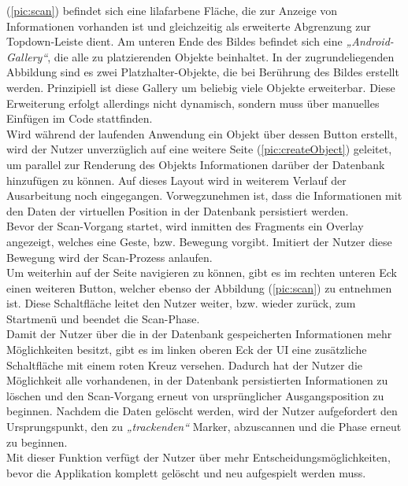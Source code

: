 (\ref{pic:scan}) befindet sich eine lilafarbene Fläche, die zur Anzeige von Informationen vorhanden ist und gleichzeitig als erweiterte Abgrenzung 
zur Topdown-Leiste dient. Am unteren Ende des Bildes befindet sich eine \textit{„Android-Gallery“}, die alle zu platzierenden Objekte beinhaltet. In 
der zugrundeliegenden Abbildung sind es zwei Platzhalter-Objekte, die bei Berührung des Bildes erstellt werden. Prinzipiell ist diese Gallery um 
beliebig viele Objekte erweiterbar. Diese Erweiterung erfolgt allerdings nicht dynamisch, sondern muss über manuelles Einfügen im Code stattfinden. 
\\
Wird während der laufenden Anwendung ein Objekt über dessen Button erstellt, wird der Nutzer unverzüglich auf eine weitere Seite (\ref{pic:createObject}) 
geleitet, um parallel zur Renderung des Objekts Informationen darüber der Datenbank hinzufügen zu können. Auf dieses Layout wird in weiterem Verlauf der 
Ausarbeitung noch eingegangen. Vorwegzunehmen ist, dass die Informationen mit den Daten der virtuellen Position in der Datenbank persistiert werden.
\\ 
\linebreak 
Bevor der Scan-Vorgang startet, wird inmitten des Fragments ein Overlay angezeigt, welches eine Geste, bzw. Bewegung vorgibt. Imitiert der Nutzer 
diese Bewegung wird der Scan-Prozess anlaufen.
\\ 
\linebreak
Um weiterhin auf der Seite navigieren zu können, gibt es im rechten unteren Eck einen weiteren Button, welcher ebenso der Abbildung (\ref{pic:scan}) 
zu entnehmen ist. Diese Schaltfläche leitet den Nutzer weiter, bzw. wieder zurück, zum Startmenü und beendet die Scan-Phase. 
\\ 
\linebreak
Damit der Nutzer über die in der Datenbank gespeicherten Informationen mehr Möglichkeiten besitzt, gibt es im linken oberen Eck der \acs{UI} eine zusätzliche 
Schaltfläche mit einem roten Kreuz versehen. Dadurch hat der Nutzer die Möglichkeit alle vorhandenen, in der Datenbank persistierten Informationen zu 
löschen und den Scan-Vorgang erneut von ursprünglicher Ausgangsposition zu beginnen. Nachdem die Daten gelöscht werden, wird der Nutzer aufgefordert den 
Ursprungspunkt, den zu \textit{„trackenden“} Marker, abzuscannen und die Phase erneut zu beginnen. 
\\ 
Mit dieser Funktion verfügt der Nutzer über mehr Entscheidungsmöglichkeiten, bevor die Applikation komplett gelöscht und neu aufgespielt werden muss.
